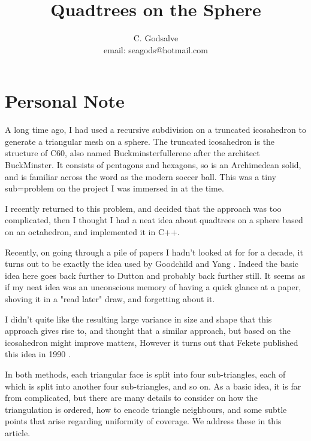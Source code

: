 \documentclass[12pt]{article}
\begin{document}

\thispagestyle{empty}

\title{Quadtrees on the Sphere}

\author{C. Godsalve \\
   email: seagods@hotmail.com}

\maketitle

\tableofcontents

\section{Personal Note} 

A long time ago, I had used a recursive subdivision on
a truncated icosahedron to generate a triangular mesh on a sphere.
The truncated icosahedron is the structure of C60, also named 
Buckminsterfullerene after the architect BuckMinster. It consists
of pentagons and hexagons, so is an Archimedean solid, and is familiar
across the word as the modern soccer ball.
This was a tiny sub=problem on the project I was immersed in at the
time.

I recently returned to this problem, and decided that the approach
was too  complicated, then
I thought I had a neat idea about quadtrees on a sphere  based on
an octahedron, and implemented
it in C++.

 Recently, on going through a pile of
papers I hadn't looked at for for a decade, it turns out to be exactly
 the idea used by Goodchild and Yang \cite{Goodchild:Mybib}. Indeed
the basic idea here goes back further to Dutton
 \cite{Dutton:Mybib} and probably back further still.
 It seems
as if my neat idea was an unconscious memory of having a quick glance
at a paper, shoving it in a "read later" draw, and forgetting about it.

I didn't quite like the resulting large variance in size and shape
that this approach gives rise to, and thought that a similar approach, but 
based on the icosahedron
might improve matters, However it turns out that Fekete published this
idea in 1990 \cite{Fekete:Mybib}.

 In both methods, each triangular face
is split into four sub-triangles, each of which is split into another four
sub-triangles, and so on. As a basic idea, it is far from complicated, but
there are many details to consider on how the triangulation is
ordered, how to encode triangle neighbours, and some subtle points that arise
regarding uniformity of coverage. We address these in this article.
\end{document}

